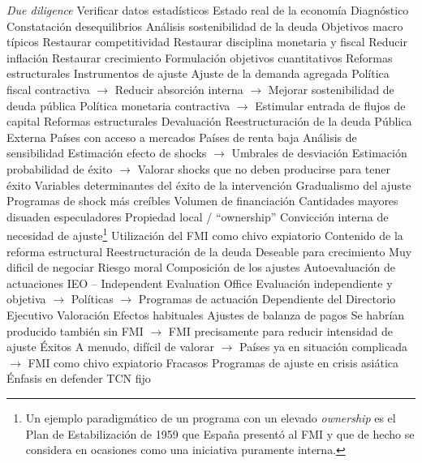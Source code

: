 \documentclass{nuevotema}
\begin{document}
\begin{esquemal}
				\4 \textit{Due diligence}
				\4[] Verificar datos estadísticos
				\4[] Estado real de la economía
				\4 Diagnóstico
				\4[]  Constatación desequilibrios
				\4[]  Análisis sostenibilidad de la deuda
				\4 Objetivos macro típicos
				\4[]  Restaurar competitividad
				\4[]  Restaurar disciplina monetaria y fiscal
				\4[]  Reducir inflación
				\4[]  Restaurar crecimiento
				\4[]  Formulación objetivos cuantitativos
				\4[]  Reformas estructurales
				\4 Instrumentos de ajuste
				\4[] Ajuste de la demanda agregada
				\4[] Política fiscal contractiva
				\4[] $\to$ Reducir absorción interna
				\4[] $\to$ Mejorar sostenibilidad de deuda pública
				\4[] Política monetaria contractiva
				\4[] $\to$ Estimular entrada de flujos de capital
				\4[] Reformas estructurales
				\4[] Devaluación
				\4 Reestructuración de la deuda
				\4[] Pública
				\4[] Externa
				\4[] Países con acceso a mercados
				\4[] Países de renta baja
				\4 Análisis de sensibilidad
				\4[] Estimación efecto de shocks
				\4[] $\to$ Umbrales de desviación
				\4[] Estimación probabilidad de éxito
				\4[] $\to$ Valorar shocks que no deben producirse para tener éxito
			\3 Variables determinantes del éxito de la intervención
				\4 Gradualismo del ajuste
				\4[] Programas de shock más creíbles
				\4 Volumen de financiación
				\4[] Cantidades mayores disuaden especuladores
				\4 Propiedad local / ``ownership''
				\4[] Convicción interna de necesidad de ajuste\footnote{Un ejemplo paradigmático de un programa con un elevado \textit{ownership} es el Plan de Estabilización de 1959 que España presentó al FMI y que de hecho se considera en ocasiones como una iniciativa puramente interna.}
				\4[] Utilización del FMI como chivo expiatorio
				\4 Contenido de la reforma estructural
				\4 Reestructuración de la deuda
				\4[] Deseable para crecimiento
				\4[] Muy dificil de negociar
				\4[] Riesgo moral
				\4 Composición de los ajustes
			\3 Autoevaluación de actuaciones
				\4 IEO -- Independent Evaluation Office
				\4[] Evaluación independiente y objetiva
				\4[] $\to$ Políticas
				\4[] $\to$ Programas de actuación
				\4[] Dependiente del Directorio Ejecutivo
			\3 Valoración
				\4 Efectos habituales
				\4[] Ajustes de balanza de pagos
				\4[] Se habrían producido también sin FMI
				\4[] $\to$ FMI precisamente para reducir intensidad de ajuste
				\4 Éxitos
				\4[] A menudo, difícil de valorar
				\4[] $\to$ Países ya en situación complicada
				\4[] $\to$ FMI como chivo expiatorio
				\4 Fracasos
				\4[] Programas de ajuste en crisis asiática
				\4[] Énfasis en defender TCN fijo

\end{esquemal}
\end{document}
